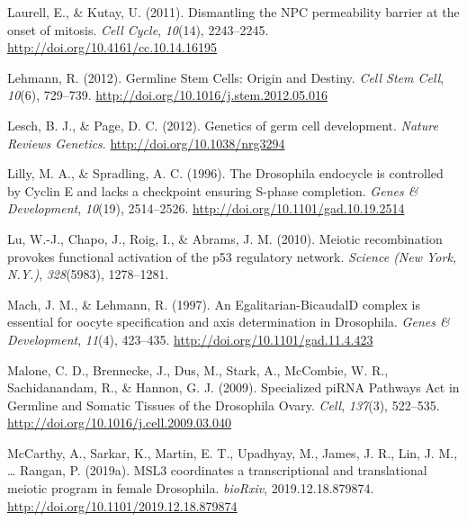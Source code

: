 \documentclass[12pt,oneside]{reedthesis}
\begin{document}
\leavevmode\hypertarget{ref-laurellDismantlingNPCPermeability2011}{}%
Laurell, E., \& Kutay, U. (2011). Dismantling the NPC permeability barrier at the onset of mitosis. \emph{Cell Cycle}, \emph{10}(14), 2243--2245. \url{http://doi.org/10.4161/cc.10.14.16195}

\leavevmode\hypertarget{ref-lehmannGermlineStemCells2012a}{}%
Lehmann, R. (2012). Germline Stem Cells: Origin and Destiny. \emph{Cell Stem Cell}, \emph{10}(6), 729--739. \url{http://doi.org/10.1016/j.stem.2012.05.016}

\leavevmode\hypertarget{ref-leschGeneticsGermCell2012}{}%
Lesch, B. J., \& Page, D. C. (2012). Genetics of germ cell development. \emph{Nature Reviews Genetics}. \url{http://doi.org/10.1038/nrg3294}

\leavevmode\hypertarget{ref-lillyDrosophilaEndocycleControlled1996}{}%
Lilly, M. A., \& Spradling, A. C. (1996). The Drosophila endocycle is controlled by Cyclin E and lacks a checkpoint ensuring S-phase completion. \emph{Genes \& Development}, \emph{10}(19), 2514--2526. \url{http://doi.org/10.1101/gad.10.19.2514}

\leavevmode\hypertarget{ref-luMeioticRecombinationProvokes2010}{}%
Lu, W.-J., Chapo, J., Roig, I., \& Abrams, J. M. (2010). Meiotic recombination provokes functional activation of the p53 regulatory network. \emph{Science (New York, N.Y.)}, \emph{328}(5983), 1278--1281.

\leavevmode\hypertarget{ref-machEgalitarianBicaudalDComplexEssential1997a}{}%
Mach, J. M., \& Lehmann, R. (1997). An Egalitarian-BicaudalD complex is essential for oocyte specification and axis determination in Drosophila. \emph{Genes \& Development}, \emph{11}(4), 423--435. \url{http://doi.org/10.1101/gad.11.4.423}

\leavevmode\hypertarget{ref-maloneSpecializedPiRNAPathways2009}{}%
Malone, C. D., Brennecke, J., Dus, M., Stark, A., McCombie, W. R., Sachidanandam, R., \& Hannon, G. J. (2009). Specialized piRNA Pathways Act in Germline and Somatic Tissues of the Drosophila Ovary. \emph{Cell}, \emph{137}(3), 522--535. \url{http://doi.org/10.1016/j.cell.2009.03.040}

\leavevmode\hypertarget{ref-mccarthyMSL3CoordinatesTranscriptional2019}{}%
McCarthy, A., Sarkar, K., Martin, E. T., Upadhyay, M., James, J. R., Lin, J. M., \ldots{} Rangan, P. (2019a). MSL3 coordinates a transcriptional and translational meiotic program in female Drosophila. \emph{bioRxiv}, 2019.12.18.879874. \url{http://doi.org/10.1101/2019.12.18.879874}
\end{document}
